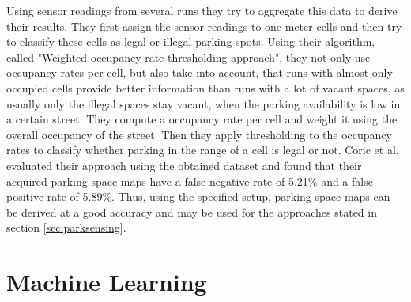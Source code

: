 Using sensor readings from several runs they try to aggregate this data to derive their results. They first assign the sensor readings to one meter cells and then try to classify these cells as legal or illegal parking spots. Using their algorithm, called "Weighted occupancy rate thresholding approach", they not only use occupancy rates per cell, but also take into account, that runs with almost only occupied cells provide better information than runs with a lot of vacant spaces, as usually only the illegal spaces stay vacant, when the parking availability is low in a certain street. They compute a occupancy rate per cell and weight it using the overall occupancy of the street. Then they apply thresholding to the occupancy rates to classify whether parking in the range of a cell is legal or not. Coric et al. evaluated their approach using the obtained dataset and found that their acquired parking space maps have a false negative rate of 5.21\% and a false positive rate of 5.89\%. Thus, using the specified setup, parking space maps can be derived at a good accuracy and may be used for the approaches stated in section \ref{sec:parksensing}.




\section{Machine Learning}

